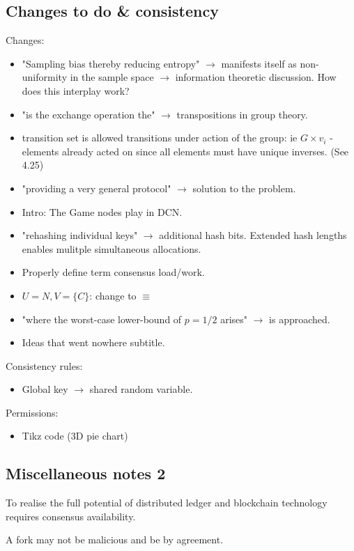 \subsection{Changes to do \& consistency}

Changes:
\begin{itemize}
	\item "Sampling bias thereby reducing entropy" $\to$ manifests itself as non-uniformity in the sample space $\to$ information theoretic discussion. How does this interplay work?
	\item "is the exchange operation the" $\to$ transpositions in group theory.
	\item transition set is allowed transitions under action of the group: ie $G \times v_i$ - elements already acted on since all elements must have unique inverses. (See 4.25)
	\item "providing a very general protocol" $\to$ solution to the problem.
	\item Intro: The Game nodes play in DCN.
	\item "rehashing individual keys" $\to$ additional hash bits. Extended hash lengths enables mulitple simultaneous allocations.
	\item Properly define term consensus load/work.
	\item $U=N, V=\{C\}$: change to $\equiv$
	\item "where the worst-case lower-bound of $p = 1/2$ arises" $\to$ is approached.
	\item Ideas that went nowhere subtitle.
\end{itemize}

Consistency rules:
\begin{itemize}
	\item Global key $\to$ shared random variable.
\end{itemize}

Permissions:
\begin{itemize}
	\item Tikz code (3D pie chart)
\end{itemize}

\subsection{Miscellaneous notes 2}

To realise the full potential of distributed ledger and blockchain technology requires consensus availability.

A fork may not be malicious and be by agreement.

